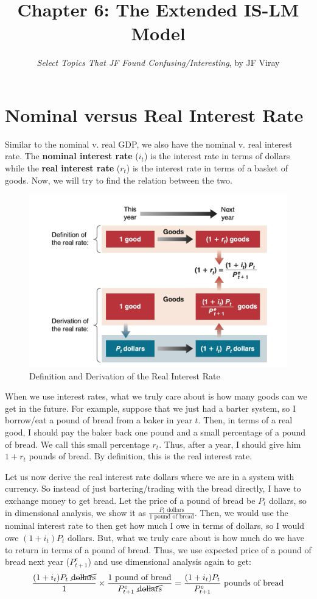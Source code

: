 \documentclass{extarticle}
\title{\vspace{-2em}Chapter 6: The Extended IS-LM Model}
\author{\emph{Select Topics That JF Found Confusing/Interesting}, by JF Viray}
\date{}
\begin{document}
\maketitle



\section{Nominal versus Real Interest Rate}
Similar to the nominal v. real GDP, we also have the nominal v. real interest rate. The \textbf{nominal interest rate} ($i_t$) is the interest rate in terms of dollars while the \textbf{real interest rate} ($r_t$) is the interest rate in terms of a basket of goods. Now, we will try to find the relation between the two.

\begin{figure}[h]
    \centering 
    \includegraphics[width=0.5\linewidth]{derivation.png} 
    \caption{Definition and Derivation of the Real Interest Rate} 
    \label{fig:derivation} 
\end{figure}

When we use interest rates, what we truly care about is how many goods can we get in the future. For example, suppose that we just had a barter system, so I borrow/eat a pound of bread from a baker in year $t$. Then, in terms of a real good, I should pay the baker back one pound and a small percentage of a pound of bread. We call this small percentage $r_t$. Thus, after a year, I should give him $1 + r_t$ pounds of bread. By definition, this is the real interest rate.  

Let us now derive the real interest rate  dollars where we are in a system with currency. So instead of just bartering/trading with the bread directly, I have to exchange money to get bread. Let the price of a pound of bread be $P_t$ dollars, so in dimensional analysis, we show it as $\frac{P_t \text{ dollars}}{1 \text{ pound of bread}}$. Then, we would use the nominal interest rate to then get how much I owe in terms of dollars, so I would owe $(1 + i_t)P_t$ dollars. 
But, what we truly care about is how much do we have to return in terms of a pound of bread. 
Thus, we use expected price of a pound of bread next year ($P^e_{t+1}$) and use dimensional analysis again to get:
$$\frac{(1+i_t) P_t \text{ } \cancel{\text{dollars}}}{1} \times \frac{1 \text{ pound of bread}}{P^e_{t+1} \text{ } \cancel{\text{dollars}}} = \frac{(1+i_t)P_t}{P^e_{t+1}} \text{ pounds of bread}$$
\end{document}
